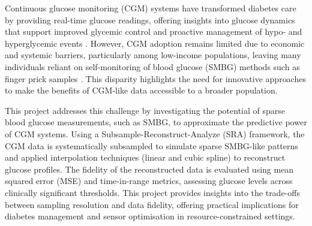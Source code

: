 Continuous glucose monitoring (CGM) systems have transformed diabetes care by providing real-time glucose readings, offering insights into glucose dynamics that support improved glycemic control and proactive management of hypo- and hyperglycemic events \cite{Heinemann2018, Beck2017, Battelino2019}. However, CGM adoption remains limited due to economic and systemic barriers, particularly among low-income populations, leaving many individuals reliant on self-monitoring of blood glucose (SMBG) methods such as finger prick samples \cite{Oser2021, ADA}. This disparity highlights the need for innovative approaches to make the benefits of CGM-like data accessible to a broader population.

This project addresses this challenge by investigating the potential of sparse blood glucose measurements, such as SMBG, to approximate the predictive power of CGM systems. Using a Subsample-Reconstruct-Analyze (SRA) framework, the CGM data is systematically subsampled to simulate sparse SMBG-like patterns and applied interpolation techniques (linear and cubic spline) to reconstruct glucose profiles. The fidelity of the reconstructed data is evaluated using mean squared error (MSE) and time-in-range metrics, assessing glucose levels across clinically significant thresholds. This project provides insights into the trade-offs between sampling resolution and data fidelity, offering practical implications for diabetes management and sensor optimisation in resource-constrained settings. 
